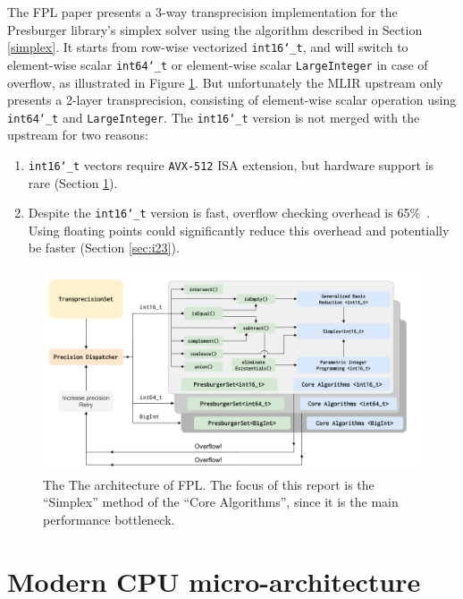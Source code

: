 \documentclass[logo,bsc,singlespacing,parskip]{infthesis}
\newcommand{\dtshort}{\texttt{int16\char`_t}}
\newcommand{\dtlong}{\texttt{int64\char`_t}}
\newenvironment{compactlist}
{ \begin{enumerate}
    \setlength{\itemsep}{0pt}
    \setlength{\parskip}{0pt}
    \setlength{\parsep}{0pt}     
}
{ \end{enumerate} }
\begin{document}
The FPL paper presents a 3-way transprecision implementation for the Presburger
library's simplex solver using the algorithm described in Section \ref{simplex}.
It starts from row-wise vectorized \dtshort{}, and will switch to  element-wise
scalar \dtlong{} or element-wise scalar \texttt{LargeInteger} in case of
overflow, as illustrated in Figure \ref{fig:fpl_arch}. But unfortunately the
MLIR upstream only presents a 2-layer transprecision, consisting of element-wise
scalar operation using \dtlong{} and \texttt{LargeInteger}. The \dtshort{}
version is not merged with the upstream for two reasons: 
\begin{compactlist} 
    \item \dtshort{} vectors require \texttt{AVX-512} ISA extension, but hardware
    support is rare (Section \ref{sec:avx512}). 
    \item Despite the \dtshort{} version is fast, overflow checking overhead is
    65\%~\cite{FPL2}. Using floating points could significantly reduce this
    overhead and potentially be faster (Section \ref{sec:i23}).  
\end{compactlist}


\begin{figure}
    \begin{center}
    \includegraphics[width=\linewidth]{image/transprecision.png}
    \caption{The The architecture of FPL. The focus of this report is the
    ``Simplex'' method of the ``Core Algorithms'', since it is the main
    performance bottleneck.~\cite{FPL2}}
    \label{fig:fpl_arch}
    \end{center}
\end{figure}

\section{Modern CPU micro-architecture}
\label{sec:avx512}
\end{document}
